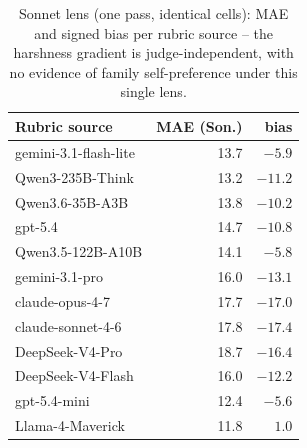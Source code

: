 \begin{table}[t]
\centering
\scriptsize
\begin{tabular}{@{}lrr@{}}
\toprule
Rubric source & MAE (Son.) & bias \\
\midrule
gemini-3.1-flash-lite & 13.7 & $-5.9$ \\
Qwen3-235B-Think & 13.2 & $-11.2$ \\
Qwen3.6-35B-A3B & 13.8 & $-10.2$ \\
gpt-5.4 & 14.7 & $-10.8$ \\
Qwen3.5-122B-A10B & 14.1 & $-5.8$ \\
gemini-3.1-pro & 16.0 & $-13.1$ \\
claude-opus-4-7 & 17.7 & $-17.0$ \\
claude-sonnet-4-6 & 17.8 & $-17.4$ \\
DeepSeek-V4-Pro & 18.7 & $-16.4$ \\
DeepSeek-V4-Flash & 16.0 & $-12.2$ \\
gpt-5.4-mini & 12.4 & $-5.6$ \\
Llama-4-Maverick & 11.8 & $1.0$ \\
\bottomrule
\end{tabular}
\caption{Sonnet lens (one pass, identical cells): MAE and signed bias per rubric source – the harshness gradient is judge-independent, with no evidence of family self-preference under this single lens.}
\label{tab:generators-sonnet}
\end{table}